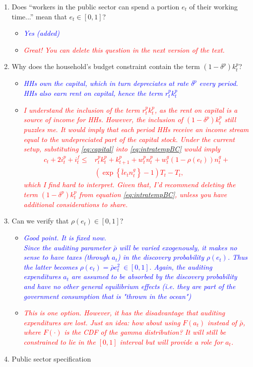 \documentclass[]{scrartcl}
\begin{document}
\begin{enumerate}
\item Does ``workers in the public sector can spend a portion $ e_t $ of their working time...'' mean that $e_t \in [0,1]$?
\begin{itemize}
\item \textcolor{blue}{\textit{Yes (added)}}
\item \textcolor{red}{\textit{Great! You can delete this question in the next version of the text.}}
\end{itemize}
\item Why does the household's budget constraint contain the term $ (1-\delta^p)k^p_t $?
\begin{itemize}
\item \textcolor{blue}{\textit{HHs own the capital, which in turn depreciates at rate $ \delta^p $ every period. HHs also earn rent on capital, hence the term $ r^p_t k_t^p $}}
\item \textcolor{red}{\textit{I understand the inclusion of the term $ r^p_t k^p_t $, as the rent on capital is a source of income for HHs. However, the inclusion of $ (1-\delta^p)k^p_t $ still puzzles me. It would imply that each period HHs receive an income stream equal to the undepreciated part of the capital stock. Under the current setup, substituting \eqref{eq:capital} into \eqref{eq:intratempBC} would imply \begin{equation*}
\begin{split}
c_t+2i^p_t+i^f_t\leq & r^p_t k^p_t+ k^p_{t+1} +  
w^p_t n_t^p+w^g_t (1-\rho(e_t))n^g_t+\\
& \left( \exp\left\lbrace \bar{l}e_tn^g_t \right\rbrace-1 \right)T_t-T_t ,
\end{split}
\end{equation*}which I find hard to interpret. Given that, I'd recommend deleting the term $ (1-\delta^p)k^p_t $ from equation \eqref{eq:intratempBC}, unless you have additional considerations to share.
}}
\end{itemize}
\item Can we verify that $ \rho(e_t) \in [0,1] $?
\begin{itemize}
\item \textcolor{blue}{\textit{Good point. It is fixed now.\\ Since the auditing parameter $ \bar{\rho} $ will be varied exogenously, it makes no sense to have taxes (through $ a_t $) in the discovery probability $ \rho(e_t) $. Thus the latter becomes $ \rho(e_t)=\bar{\rho}e_t^2~\in[0,1] $. Again, the auditing expenditures $ a_t $ are assumed to be absorbed by the discovery probability and have no other general equilibrium effects (i.e. they are part of the government consumption that is "thrown in the ocean")}}
\item \textcolor{red}{\textit{This is one option. However, it has the disadvantage that auditing expenditures are lost. Just an idea: how about using $F(a_t)$ instead of $\bar{\rho}$, where $ F(\cdot) $ is the CDF of the gamma distribution? It will still be constrained to lie in the $ [0,1] $ interval but will provide a role for $a_t$.}}
\end{itemize}
\item Public sector specification


\end{enumerate}
\end{document}
